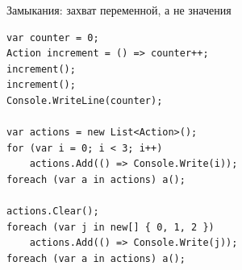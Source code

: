 \documentclass[aspectratio=169,10pt,t]{beamer}
\begin{document}
\begin{frame}[fragile]{Замыкания: захват переменной, а не значения}
  \slidetop
  \begin{minipage}[t]{0.66\textwidth}
\begin{lstlisting}[style=csharp,basicstyle=\ttfamily\fontsize{7.6}{9.0}\selectfont]
var counter = 0;
Action increment = () => counter++;
increment();
increment();
Console.WriteLine(counter);

var actions = new List<Action>();
for (var i = 0; i < 3; i++)
    actions.Add(() => Console.Write(i));
foreach (var a in actions) a();

actions.Clear();
foreach (var j in new[] { 0, 1, 2 })
    actions.Add(() => Console.Write(j));
foreach (var a in actions) a();
\end{lstlisting}
  \end{minipage}\hfill
  \begin{minipage}[t]{0.30\textwidth}
    \vspace{2.2em}
    {\large\ttfamily{}}\enspace{}\par
    \vspace{3.75em}
    {\large\ttfamily{}}\enspace{}\par
    \vspace{3.75em}
    {\large\ttfamily{}}\enspace{}
  \end{minipage}
\end{frame}
\end{document}
